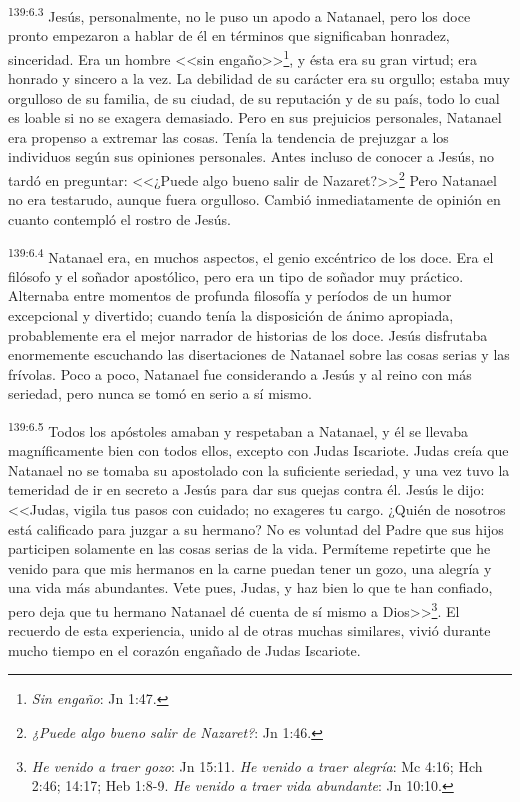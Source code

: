 \par 
\textsuperscript{139:6.3} Jesús, personalmente, no le puso un apodo a Natanael, pero los doce pronto empezaron a hablar de él en términos que significaban honradez, sinceridad. Era un hombre <<sin engaño>>\footnote{\textit{Sin engaño}: Jn 1:47.}, y ésta era su gran virtud; era honrado y sincero a la vez. La debilidad de su carácter era su orgullo; estaba muy orgulloso de su familia, de su ciudad, de su reputación y de su país, todo lo cual es loable si no se exagera demasiado. Pero en sus prejuicios personales, Natanael era propenso a extremar las cosas. Tenía la tendencia de prejuzgar a los individuos según sus opiniones personales. Antes incluso de conocer a Jesús, no tardó en preguntar: <<¿Puede algo bueno salir de Nazaret?>>\footnote{\textit{¿Puede algo bueno salir de Nazaret?}: Jn 1:46.} Pero Natanael no era testarudo, aunque fuera orgulloso. Cambió inmediatamente de opinión en cuanto contempló el rostro de Jesús.

\par 
\textsuperscript{139:6.4} Natanael era, en muchos aspectos, el genio excéntrico de los doce. Era el filósofo y el soñador apostólico, pero era un tipo de soñador muy práctico. Alternaba entre momentos de profunda filosofía y períodos de un humor excepcional y divertido; cuando tenía la disposición de ánimo apropiada, probablemente era el mejor narrador de historias de los doce. Jesús disfrutaba enormemente escuchando las disertaciones de Natanael sobre las cosas serias y las frívolas. Poco a poco, Natanael fue considerando a Jesús y al reino con más seriedad, pero nunca se tomó en serio a sí mismo.

\par 
\textsuperscript{139:6.5} Todos los apóstoles amaban y respetaban a Natanael, y él se llevaba magníficamente bien con todos ellos, excepto con Judas Iscariote. Judas creía que Natanael no se tomaba su apostolado con la suficiente seriedad, y una vez tuvo la temeridad de ir en secreto a Jesús para dar sus quejas contra él. Jesús le dijo: <<Judas, vigila tus pasos con cuidado; no exageres tu cargo. ¿Quién de nosotros está calificado para juzgar a su hermano? No es voluntad del Padre que sus hijos participen solamente en las cosas serias de la vida. Permíteme repetirte que he venido para que mis hermanos en la carne puedan tener un gozo, una alegría y una vida más abundantes. Vete pues, Judas, y haz bien lo que te han confiado, pero deja que tu hermano Natanael dé cuenta de sí mismo a Dios>>\footnote{\textit{He venido a traer gozo}: Jn 15:11. \textit{He venido a traer alegría}: Mc 4:16; Hch 2:46; 14:17; Heb 1:8-9. \textit{He venido a traer vida abundante}: Jn 10:10.}. El recuerdo de esta experiencia, unido al de otras muchas similares, vivió durante mucho tiempo en el corazón engañado de Judas Iscariote.

